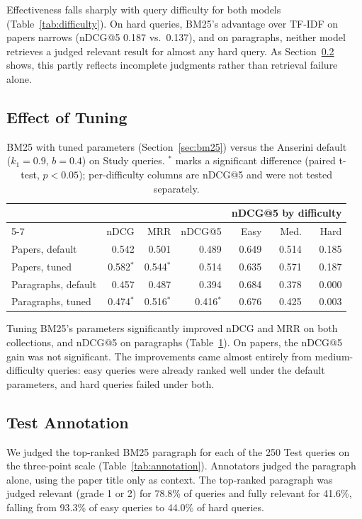 \documentclass[sigconf,nonacm]{acmart}
\begin{document}
Effectiveness falls sharply with query difficulty for both models
(Table~\ref{tab:difficulty}). On hard queries, BM25's advantage over
TF-IDF on papers narrows (nDCG@5 0.187 vs.\ 0.137), and on paragraphs, 
neither model retrieves a judged relevant result for almost any hard query. 
As Section~\ref{sec:annotation} shows, this partly reflects incomplete 
judgments rather than retrieval failure alone.

\subsection{Effect of Tuning}
\label{sec:tuning-results}

\begin{table}[t]
  \caption{BM25 with tuned parameters (Section~\ref{sec:bm25}) versus the
    Anserini default ($k_1 = 0.9$, $b = 0.4$) on Study queries.
    $^{*}$ marks a significant difference (paired t-test, $p < 0.05$);
    per-difficulty columns are nDCG@5 and were not tested separately.}
  \label{tab:tuning-study}
  \small
  \setlength{\tabcolsep}{3pt}
  \begin{tabular}{lrrrrrr}
    \toprule
    & & & & \multicolumn{3}{c}{nDCG@5 by difficulty} \\
    \cmidrule(l){5-7}
    & nDCG & MRR & nDCG@5 & Easy & Med. & Hard \\
    \midrule
    Papers, default      & 0.542 & 0.501 & 0.489 & 0.649 & 0.514 & 0.185 \\
    Papers, tuned        & 0.582$^{*}$ & 0.544$^{*}$ & 0.514 & 0.635 & 0.571 & 0.187 \\
    \midrule
    Paragraphs, default  & 0.457 & 0.487 & 0.394 & 0.684 & 0.378 & 0.000 \\
    Paragraphs, tuned    & 0.474$^{*}$ & 0.516$^{*}$ & 0.416$^{*}$ & 0.676 & 0.425 & 0.003 \\
    \bottomrule
  \end{tabular}
\end{table}

Tuning BM25's parameters significantly improved nDCG and MRR on both collections, and
nDCG@5 on paragraphs (Table~\ref{tab:tuning-study}). On papers, the
nDCG@5 gain was not significant. The improvements came almost entirely
from medium-difficulty queries: easy queries were already ranked well
under the default parameters, and hard queries failed under both.

\subsection{Test Annotation}
\label{sec:annotation}
We judged the top-ranked BM25 paragraph for each of the 250 Test queries
on the three-point scale (Table~\ref{tab:annotation}). Annotators judged
the paragraph alone, using the paper title only as context. The
top-ranked paragraph was judged relevant (grade 1 or 2) for 78.8\% of
queries and fully relevant for 41.6\%, falling from 93.3\% of easy
queries to 44.0\% of hard queries.
\end{document}
